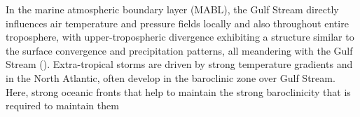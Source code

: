 In the marine atmospheric boundary layer (MABL), the Gulf Stream directly influences air temperature and pressure fields locally and also throughout entire troposphere, with upper-tropospheric divergence exhibiting a structure similar to the surface convergence and precipitation patterns, all meandering with the Gulf Stream (\cite{minobe2008influence}). Extra-tropical storms are driven by strong temperature gradients and in the North Atlantic, often develop in the baroclinic zone over Gulf Stream. Here, strong oceanic fronts that help to maintain the strong baroclinicity that is required to maintain them \citep{nakamura2004observed, nakamura2008importance, hoskins1990existence}




